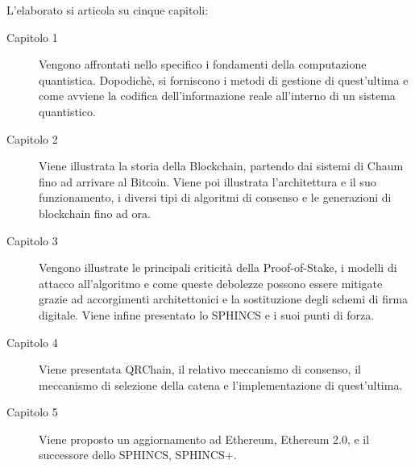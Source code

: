 L'elaborato si articola su cinque capitoli:
\begin{description}
  \item[Capitolo 1] Vengono affrontati nello specifico i fondamenti della computazione quantistica. Dopodichè, si forniscono i metodi di gestione di quest'ultima e come avviene la codifica dell'informazione reale all'interno di un sistema quantistico.
  \item[Capitolo 2] Viene illustrata la storia della Blockchain, partendo dai sistemi di Chaum fino ad arrivare al Bitcoin. Viene poi illustrata l'architettura e il suo funzionamento, i diversi tipi di algoritmi di consenso e le generazioni di blockchain fino ad ora.
  \item[Capitolo 3] Vengono illustrate le principali criticità della Proof-of-Stake, i modelli di attacco all'algoritmo e come queste debolezze possono essere mitigate grazie ad accorgimenti architettonici e la sostituzione degli schemi di firma digitale. Viene infine presentato lo SPHINCS e i suoi punti di forza.
  \item[Capitolo 4] Viene presentata QRChain, il relativo meccanismo di consenso, il meccanismo di selezione della catena e l'implementazione di quest'ultima.
  \item[Capitolo 5] Viene proposto un aggiornamento ad Ethereum, Ethereum 2.0, e il successore dello SPHINCS, SPHINCS+. 
\end{description}
